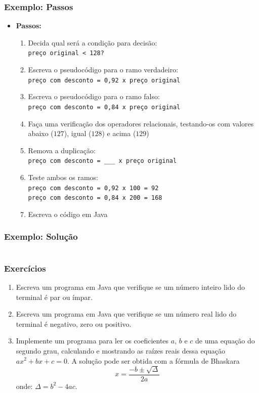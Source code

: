 \documentclass[xcolor={dvipsnames,table},aspectratio=169]{beamer}
\begin{document}
\begin{frame}\frametitle{Exemplo: Passos}
\begin{itemize}
\item \textbf{Passos:}
	\begin{enumerate}
		\item Decida qual será a condição para decisão:\\ \texttt{preço original < 128?}
		\item Escreva o pseudocódigo para o ramo verdadeiro:\\ \texttt{preço com desconto = 0,92 x preço original}
		\item Escreva o pseudocódigo para o ramo falso:\\ \texttt{preço com desconto = 0,84 x preço original}
		\item Faça uma verificação dos operadores relacionais, testando-os com valores abaixo ($127$), igual ($128$) e acima ($129$)
		\item Remova a duplicação:\\ \texttt{preço com desconto = \_\_\_ x preço original}
		\item Teste ambos os ramos:\\ \texttt{preço com desconto = 0,92 x 100 = 92\\preço com desconto = 0,84 x 200 = 168}
		\item Escreva o código em Java
	\end{enumerate}
\end{itemize}
\end{frame}

\begin{frame}[fragile]\frametitle{Exemplo: Solução}
\scriptsize{\inputminted[bgcolor=cyan!10]{java}{src/Livraria.java}}
\end{frame}

\begin{frame}\frametitle{Exercícios}
\begin{enumerate}
	\item Escreva um programa em Java que verifique se um número inteiro lido do terminal é par ou ímpar.
	\item Escreva um programa em Java que verifique se um número real lido do terminal é negativo, zero  ou positivo.
	\item Implemente um programa para ler os coeficientes $a$, $b$ e $c$ de uma equação do segundo grau, calculando e mostrando as raízes reais dessa equação\\$ax^2 + bx + c = 0$. A solução pode ser obtida com a fórmula de Bhaskara
\[x=\frac{-b\pm\sqrt{\Delta}}{2a}\]
onde: $\Delta = b^2-4ac$.
\end{enumerate}
\end{frame}
\end{document}

